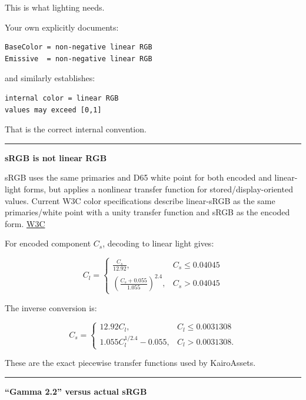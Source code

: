 This is what lighting needs.

Your own  explicitly documents:

\begin{verbatim}
BaseColor = non-negative linear RGB
Emissive  = non-negative linear RGB
\end{verbatim}

and  similarly establishes:

\begin{verbatim}
internal color = linear RGB
values may exceed [0,1]
\end{verbatim}

That is the correct internal convention.

\begin{center}\rule{0.5\linewidth}{0.5pt}\end{center}

\textbf{sRGB is not linear RGB}

sRGB uses the same primaries and D65 white point for both encoded and linear-light forms, but applies a nonlinear transfer function for stored/display-oriented values. Current W3C color specifications describe linear-sRGB as the same primaries/white point with a unity transfer function and sRGB as the encoded form. \href{https://www.w3.org/TR/css-color/?utm_source=chatgpt.com}{W3C}

For encoded component \(C_s\), decoding to linear light gives:

\[
\boxed{
C_l=
\begin{cases}
\frac{C_s}{12.92},
&
C_s\le0.04045
\\[6pt]
\left(
\frac{C_s+0.055}{1.055}
\right)^{2.4},
&
C_s>0.04045
\end{cases}
}
\]

The inverse conversion is:

\[
\boxed{
C_s=
\begin{cases}
12.92C_l,
&
C_l\le0.0031308
\\[6pt]
1.055C_l^{1/2.4}-0.055,
&
C_l>0.0031308.
\end{cases}
}
\]

These are the exact piecewise transfer functions used by KairoAssets.

\begin{center}\rule{0.5\linewidth}{0.5pt}\end{center}

\textbf{``Gamma 2.2'' versus actual sRGB}

